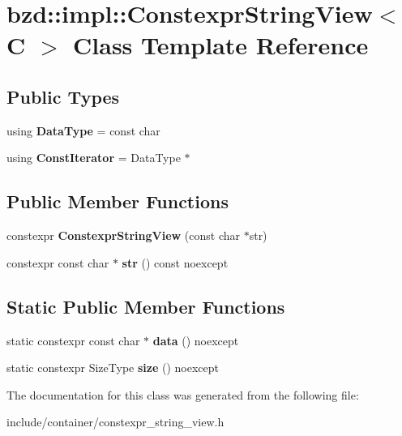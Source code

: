 \hypertarget{classbzd_1_1impl_1_1ConstexprStringView}{}\section{bzd\+:\+:impl\+:\+:Constexpr\+String\+View$<$ C $>$ Class Template Reference}
\label{classbzd_1_1impl_1_1ConstexprStringView}
\subsection*{Public Types}
\begin{DoxyCompactItemize}
\item 
\mbox{\label{classbzd_1_1impl_1_1ConstexprStringView_aa05cc01072f27b5729961fb844a608cf}} 
using {\bfseries Data\+Type} = const char
\item 
\mbox{\label{classbzd_1_1impl_1_1ConstexprStringView_aca0350e87abb93fcac860f58e67076bf}} 
using {\bfseries Const\+Iterator} = Data\+Type $\ast$
\end{DoxyCompactItemize}
\subsection*{Public Member Functions}
\begin{DoxyCompactItemize}
\item 
\mbox{\label{classbzd_1_1impl_1_1ConstexprStringView_a4c191abbff58e6c0eafa4cb8e3a1b1c5}} 
constexpr {\bfseries Constexpr\+String\+View} (const char $\ast$str)
\item 
\mbox{\label{classbzd_1_1impl_1_1ConstexprStringView_aa94c09e044591e594909e0fb8271e8ba}} 
constexpr const char $\ast$ {\bfseries str} () const noexcept
\end{DoxyCompactItemize}
\subsection*{Static Public Member Functions}
\begin{DoxyCompactItemize}
\item 
\mbox{\label{classbzd_1_1impl_1_1ConstexprStringView_afef78c4bba05e9042de1baa749586bde}} 
static constexpr const char $\ast$ {\bfseries data} () noexcept
\item 
\mbox{\label{classbzd_1_1impl_1_1ConstexprStringView_af627511b8390a422377e4892eb28a4ae}} 
static constexpr Size\+Type {\bfseries size} () noexcept
\end{DoxyCompactItemize}


The documentation for this class was generated from the following file\+:\begin{DoxyCompactItemize}
\item 
include/container/constexpr\+\_\+string\+\_\+view.\+h\end{DoxyCompactItemize}
